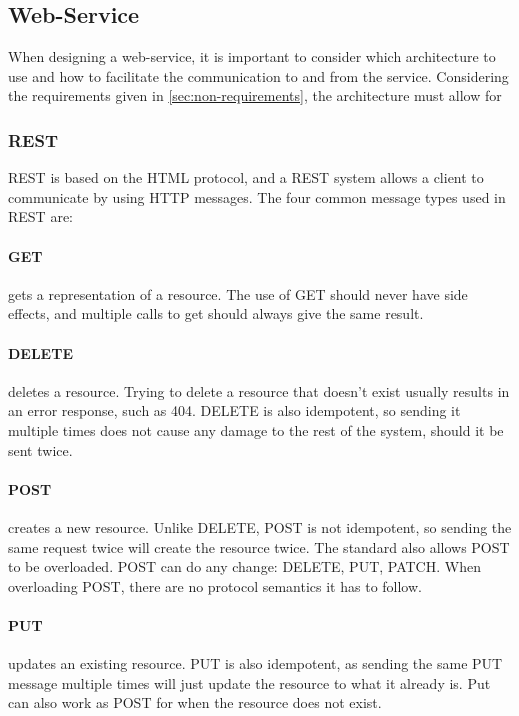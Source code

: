 
\subsection{Web-Service}
When designing a web-service, it is important to consider which architecture to use and how to facilitate the communication to and from the service. Considering the requirements given in \ref{sec:non-requirements}, the architecture must allow for 

\subsubsection{REST}
REST is based on the HTML protocol, and a REST system allows a client to communicate by using HTTP messages.
The four common message types used in REST are:

\paragraph{GET} gets a representation of a resource. The use of GET should never have side effects, and multiple calls to get should always give the same result.
\paragraph{DELETE} deletes a resource. Trying to delete a resource that doesn't exist usually results in an error response, such as 404. DELETE is also idempotent, so sending it multiple times does not cause any damage to the rest of the system, should it be sent twice.
\paragraph{POST} creates a new resource. Unlike DELETE, POST is not idempotent, so sending the same request twice will create the resource twice. 
The standard also allows POST to be overloaded. POST can do any change: DELETE, PUT, PATCH. When overloading POST, there are no protocol semantics it has to follow.
\paragraph{PUT} updates an existing resource. PUT is also idempotent, as sending the same PUT message multiple times will just update the resource to what it already is. Put can also work as POST for when the resource does not exist.



